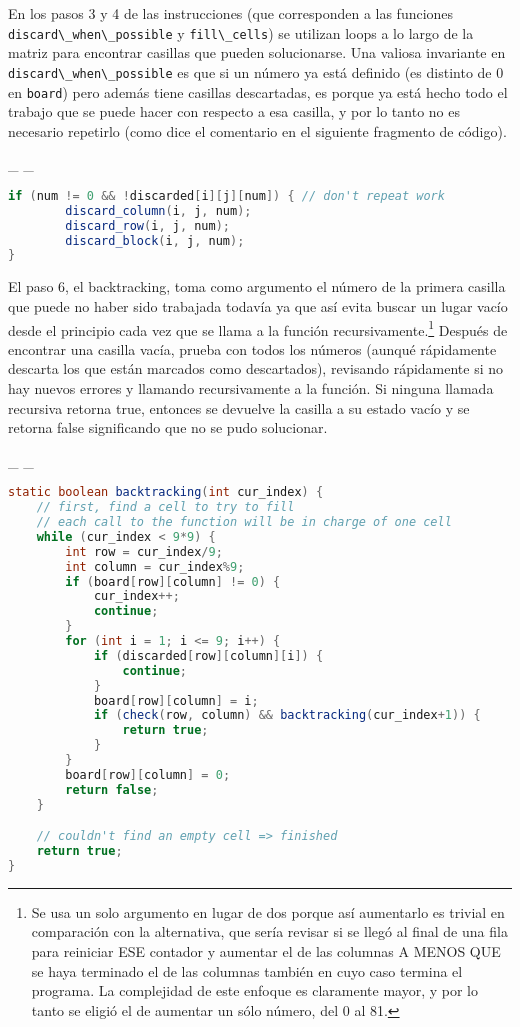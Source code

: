 \documentclass[
  spanish,
  a4paper,
,tablecaptionabove
]{scrartcl}
\newcommand{\passthrough}[1]{#1}
\begin{document}
En los pasos 3 y 4 de las instrucciones (que corresponden a las
funciones \passthrough{\lstinline!discard\_when\_possible!} y
\passthrough{\lstinline!fill\_cells!}) se utilizan loops a lo largo de
la matriz para encontrar casillas que pueden solucionarse. Una valiosa
invariante en \passthrough{\lstinline!discard\_when\_possible!} es que
si un número ya está definido (es distinto de 0 en
\passthrough{\lstinline!board!}) pero además tiene casillas descartadas,
es porque ya está hecho todo el trabajo que se puede hacer con respecto
a esa casilla, y por lo tanto no es necesario repetirlo (como dice el
comentario en el siguiente fragmento de código).

\_ \_

\begin{lstlisting}[language=Java]
if (num != 0 && !discarded[i][j][num]) { // don't repeat work
        discard_column(i, j, num);
        discard_row(i, j, num);
        discard_block(i, j, num);
}
\end{lstlisting}

El paso 6, el backtracking, toma como argumento el número de la primera
casilla que puede no haber sido trabajada todavía ya que así evita
buscar un lugar vacío desde el principio cada vez que se llama a la
función recursivamente.\footnote{Se usa un solo argumento en lugar de
  dos porque así aumentarlo es trivial en comparación con la
  alternativa, que sería revisar si se llegó al final de una fila para
  reiniciar ESE contador y aumentar el de las columnas A MENOS QUE se
  haya terminado el de las columnas también en cuyo caso termina el
  programa. La complejidad de este enfoque es claramente mayor, y por lo
  tanto se eligió el de aumentar un sólo número, del 0 al 81.}
Después de encontrar una casilla vacía, prueba con todos los números
(aunqué rápidamente descarta los que están marcados como descartados),
revisando rápidamente si no hay nuevos errores y llamando recursivamente
a la función. Si ninguna llamada recursiva retorna true, entonces se
devuelve la casilla a su estado vacío y se retorna false significando
que no se pudo solucionar.

\_ \_

\begin{lstlisting}[language=Java]
static boolean backtracking(int cur_index) {
    // first, find a cell to try to fill
    // each call to the function will be in charge of one cell
    while (cur_index < 9*9) {
        int row = cur_index/9;
        int column = cur_index%9;
        if (board[row][column] != 0) {
            cur_index++;
            continue;
        }
        for (int i = 1; i <= 9; i++) {
            if (discarded[row][column][i]) {
                continue;
            }
            board[row][column] = i;
            if (check(row, column) && backtracking(cur_index+1)) {
                return true;
            }
        }
        board[row][column] = 0;
        return false;
    }

    // couldn't find an empty cell => finished
    return true;
}
\end{lstlisting}
\end{document}
